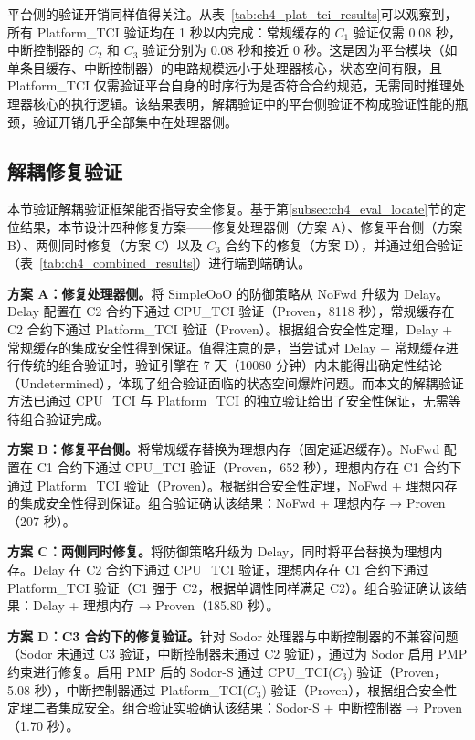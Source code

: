平台侧的验证开销同样值得关注。从表~\ref{tab:ch4_plat_tci_results}可以观察到，所有 Platform\_TCI 验证均在 1 秒以内完成：常规缓存的 $C_1$ 验证仅需 0.08 秒，中断控制器的 $C_2$ 和 $C_3$ 验证分别为 0.08 秒和接近 0 秒。这是因为平台模块（如单条目缓存、中断控制器）的电路规模远小于处理器核心，状态空间有限，且 Platform\_TCI 仅需验证平台自身的时序行为是否符合合约规范，无需同时推理处理器核心的执行逻辑。该结果表明，解耦验证中的平台侧验证不构成验证性能的瓶颈，验证开销几乎全部集中在处理器侧。

\subsection{解耦修复验证}
\label{subsec:ch4_eval_fix}

本节验证解耦验证框架能否指导安全修复。基于第\ref{subsec:ch4_eval_locate}节的定位结果，本节设计四种修复方案——修复处理器侧（方案 A）、修复平台侧（方案 B）、两侧同时修复（方案 C）以及 $C_3$ 合约下的修复（方案 D），并通过组合验证（表~\ref{tab:ch4_combined_results}）进行端到端确认。

\textbf{方案 A：修复处理器侧。}将 SimpleOoO 的防御策略从 NoFwd 升级为 Delay。Delay 配置在 C2 合约下通过 CPU\_TCI 验证（Proven，8118 秒），常规缓存在 C2 合约下通过 Platform\_TCI 验证（Proven）。根据组合安全性定理，Delay + 常规缓存的集成安全性得到保证。值得注意的是，当尝试对 Delay + 常规缓存进行传统的组合验证时，验证引擎在 7 天（10080 分钟）内未能得出确定性结论（Undetermined），体现了组合验证面临的状态空间爆炸问题。而本文的解耦验证方法已通过 CPU\_TCI 与 Platform\_TCI 的独立验证给出了安全性保证，无需等待组合验证完成。

\textbf{方案 B：修复平台侧。}将常规缓存替换为理想内存（固定延迟缓存）。NoFwd 配置在 C1 合约下通过 CPU\_TCI 验证（Proven，652 秒），理想内存在 C1 合约下通过 Platform\_TCI 验证（Proven）。根据组合安全性定理，NoFwd + 理想内存的集成安全性得到保证。组合验证确认该结果：NoFwd + 理想内存 → Proven（207 秒）。

\textbf{方案 C：两侧同时修复。}将防御策略升级为 Delay，同时将平台替换为理想内存。Delay 在 C2 合约下通过 CPU\_TCI 验证，理想内存在 C1 合约下通过 Platform\_TCI 验证（C1 强于 C2，根据单调性同样满足 C2）。组合验证确认该结果：Delay + 理想内存 → Proven（185.80 秒）。

\textbf{方案 D：C3 合约下的修复验证。}针对 Sodor 处理器与中断控制器的不兼容问题（Sodor 未通过 C3 验证，中断控制器未通过 C2 验证），通过为 Sodor 启用 PMP 约束进行修复。启用 PMP 后的 Sodor-S 通过 CPU\_TCI($C_3$) 验证（Proven，5.08 秒），中断控制器通过 Platform\_TCI($C_3$) 验证（Proven），根据组合安全性定理二者集成安全。组合验证实验确认该结果：Sodor-S + 中断控制器 → Proven（1.70 秒）。

